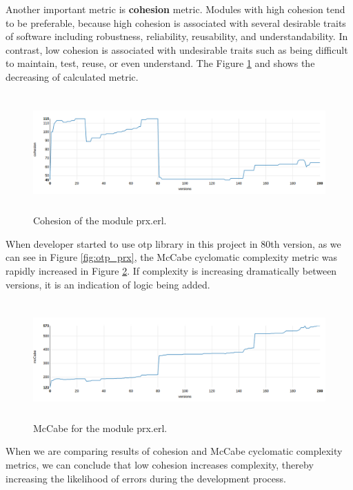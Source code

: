 Another important metric is \textbf{cohesion} metric. Modules with high cohesion tend to be preferable, because high cohesion is associated with several desirable traits of software including robustness, reliability, reusability, and understandability. In contrast, low cohesion is associated with undesirable traits such as being difficult to maintain, test, reuse, or even understand. 
The Figure \ref{fig:cohesion_prx} and shows the decreasing of calculated metric. 

\begin{figure}[h]
	\centering
	\includegraphics[height=45mm]{figures/cohesion_prx.png}
	\caption{Cohesion of the module prx.erl.}
	\label{fig:cohesion_prx}
\end{figure}

When developer started to use otp library in this project in 80th version, as we can see in Figure \ref{fig:otp_prx}, the McCabe cyclomatic complexity metric was rapidly increased in Figure \ref{fig:McCabe}. If complexity is increasing dramatically between versions, it is an indication of logic 
being added. 

\begin{figure}[h]
	\centering
	\includegraphics[height=45mm]{figures/mccabe.png}
	\caption{McCabe for the module prx.erl.}
	\label{fig:McCabe}
\end{figure}

When we are comparing results of cohesion and McCabe cyclomatic complexity metrics, we can conclude that low cohesion increases complexity, thereby increasing the likelihood of errors during the development process.

